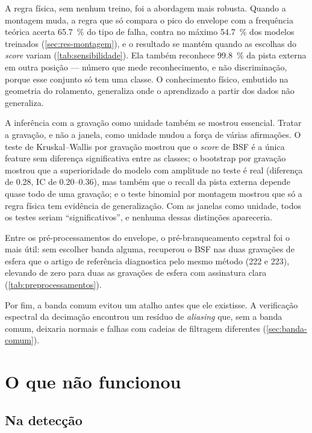 A regra física, sem nenhum treino, foi a abordagem mais robusta. Quando a
montagem muda, a regra que só
compara o pico do envelope com a frequência teórica acerta \SI{65.7}{\percent} do
tipo de falha, contra no máximo \SI{54.7}{\percent} dos modelos treinados
(\autoref{sec:res-montagem}), e o resultado se mantém quando as escolhas do
\emph{score} variam (\autoref{tab:sensibilidade}). Ela também reconhece
\SI{99.8}{\percent} da pista externa em outra posição --- número que mede
reconhecimento, e não discriminação, porque esse conjunto só tem uma classe.
O conhecimento físico, embutido na geometria do rolamento, generaliza onde o
aprendizado a partir dos dados não generaliza.

A inferência com a gravação como unidade também se mostrou essencial. Tratar a
gravação, e não a janela, como unidade mudou a força de várias afirmações. O teste de
Kruskal--Wallis por gravação mostrou que o \emph{score} de BSF é a única feature sem
diferença significativa entre as classes; o bootstrap por gravação mostrou que a
superioridade do modelo com amplitude no teste é real (diferença de \num{0.28},
IC de \numrange{0.20}{0.36}), mas também que o recall da pista externa depende
quase todo de uma gravação; e o teste binomial por montagem mostrou que só a
regra física tem evidência de generalização. Com as janelas como unidade, todos os
testes seriam ``significativos'', e nenhuma dessas distinções apareceria.

Entre os pré-processamentos do envelope, o pré-branqueamento cepstral foi o
mais útil: sem escolher banda alguma, recuperou o BSF nas duas gravações de esfera que o artigo de referência
diagnostica pelo mesmo método (222 e 223), elevando de zero para duas as
gravações de esfera com assinatura clara (\autoref{tab:preprocessamentos}).

Por fim, a banda comum evitou um atalho antes que ele existisse. A verificação
espectral da decimação encontrou
um resíduo de \emph{aliasing} que, sem a banda comum, deixaria normais e falhas
com cadeias de filtragem diferentes (\autoref{sec:banda-comum}).

\section{O que não funcionou}
\label{sec:nao-funcionou}

\subsection{Na detecção}
\label{sec:nao-funcionou-deteccao}

